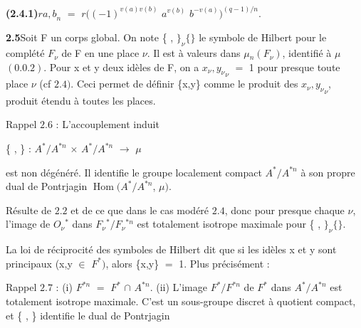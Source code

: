 \documentclass[10pt,a4paper]{article}
\begin{document}
\par\noindent\textbf{(2.4.1)}\quad $r{a,b}_n$ $=$ $r((-1)^{v(a)v(b)}$ $a^{v(b)}$ $b^{-v(a)})^{(q-1)/n}$.\par
\par\noindent\textbf{2.5}\quad Soit F un corps global. On note \{ , $\}_\nu\{\}$ le symbole de Hilbert pour le complété $F_\nu{}$ de F en une place $\nu{}$. Il est à valeurs dans $\mu{}_n(F_\nu{})$, identifié à $\mu{}$ $(0.0.2)$. Pour x et y deux idèles de F, on a ${x_\nu{},y_\nu{}}_\nu{}$ $=$ 1 pour presque toute place $\nu{}$ (cf $2.4)$. Ceci permet de définir \{x,y\} comme le produit des ${x_\nu{},y_\nu{}}_\nu{}$, produit étendu à toutes les places.\par
\par Rappel $2.6$ : L'accouplement induit\par
\par\smallskip\begin{center}\begin{minipage}{0.96\textwidth}\centering
\{ , \} : $A^*/A^{*n}$ $\times{}$ $A^*/A^{*n}$ $\to{}$ $\mu{}$
\end{minipage}\end{center}\smallskip
\par est non dégénéré. Il identifie le groupe localement compact $A^*/A^{*n}$ à son propre dual de Pontrjagin $\operatorname{Hom}(A^*/A^{*n}$, $\mu{})$.\par
\par Résulte de $2.2$ et de ce que dans le cas modéré $2.4$, donc pour presque chaque $\nu{}$, l'image de $O_\nu{}^*$ dans $F_\nu{}^*/F_\nu{}^{*n}$ est totalement isotrope maximale pour \{ , $\}_\nu\{\}$.\par
\par La loi de réciprocité des symboles de Hilbert dit que si les idèles x et y sont principaux (x,y $\in{}$ $F^*)$, alors \{x,y\} $=$ 1. Plus précisément :\par
\par Rappel $2.7$ : (i) $F^{*n}$ $=$ $F^*$ $\cap{}$ $A^{*n}$. (ii) L'image $F^*/F^{*n}$ de $F^*$ dans $A^*/A^{*n}$ est totalement isotrope maximale. C'est un sous-groupe discret à quotient compact, et \{ , \} identifie le dual de Pontrjagin\par
\end{document}
